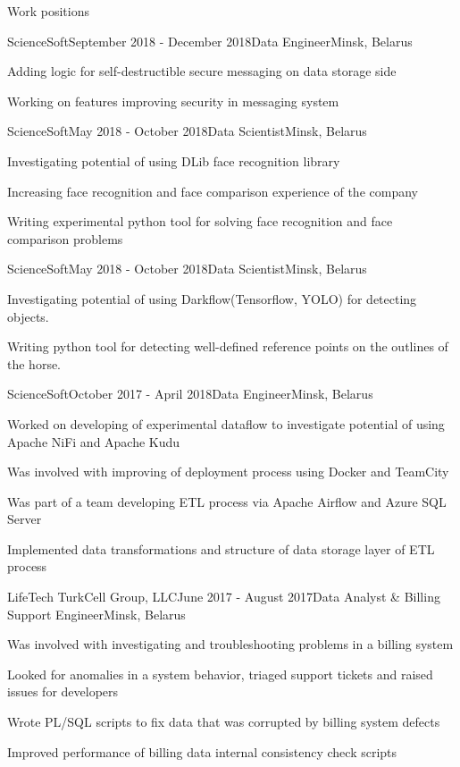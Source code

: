 \documentclass{resume} %
\begin{document}
\begin{rSection}{Work positions}
\begin{rSubsection}{ScienceSoft}{September 2018 - December 2018}{Data Engineer}{Minsk, Belarus}
\item Adding logic for self-destructible secure messaging on data storage side
\item Working on features improving security in messaging system
\end{rSubsection}

\begin{rSubsection}{ScienceSoft}{May 2018 - October 2018}{Data Scientist}{Minsk, Belarus}
\item Investigating potential of using DLib face recognition library
\item Increasing face recognition and face comparison experience of the company
\item Writing experimental python tool for solving face recognition and face comparison problems
\end{rSubsection}

\begin{rSubsection}{ScienceSoft}{May 2018 - October 2018}{Data Scientist}{Minsk, Belarus}
\item Investigating potential of using Darkflow(Tensorflow, YOLO) for detecting objects.
\item Writing python tool for detecting well-defined reference points on the outlines of the horse.
\end{rSubsection}

\begin{rSubsection}{ScienceSoft}{October 2017 - April 2018}{Data Engineer}{Minsk, Belarus}
\item Worked on developing of experimental dataflow to investigate potential of using Apache NiFi and Apache Kudu
\item Was involved with improving of deployment process using Docker and TeamCity
\item Was part of a team developing ETL process via Apache Airflow and Azure SQL Server
\item Implemented data transformations and structure of data storage layer of ETL process
\end{rSubsection}

\begin{rSubsection}{LifeTech TurkCell Group, LLC}{June 2017 - August 2017}{Data Analyst \& Billing Support Engineer}{Minsk, Belarus}
\item Was involved with investigating and troubleshooting problems in a billing system
\item Looked for anomalies in a system behavior, triaged support tickets and raised issues for developers
\item Wrote PL/SQL scripts to fix data that was corrupted by billing system defects
\item Improved performance of billing data internal consistency check scripts
\end{rSubsection}


\end{rSection}
\end{document}
